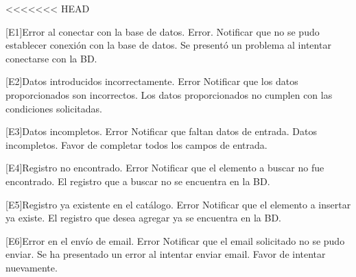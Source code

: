	\begin{Citemize}
<<<<<<< HEAD
		\item
		\begin{Message}{[E1]}{Error al conectar con la base de datos.}
			\MSGitem[Tipo: ] Error.
			\MSGitem[Objetivo: ] Notificar que no se pudo establecer conexión con la base de datos.
			\MSGitem[Redacción: ] Se presentó un problema al intentar conectarse con la BD.
		\end{Message}
	
		\item
		\begin{Message}{[E2]}{Datos introducidos incorrectamente.}
			\MSGitem[Tipo: ] Error
			\MSGitem[Objetivo: ] Notificar que los datos proporcionados son incorrectos.
			\MSGitem[Redacción: ] Los datos proporcionados no cumplen con las condiciones solicitadas.
		\end{Message}
	
		\item 
		\begin{Message}{[E3]}{Datos incompletos.}
			\MSGitem[Tipo: ] Error
			\MSGitem[Objetivo: ] Notificar que faltan datos de entrada.
			\MSGitem[Redacción: ] Datos incompletos. Favor de completar todos los campos de entrada.
		\end{Message}
	
		\item 
		\begin{Message}{[E4]}{Registro no encontrado.}
			\MSGitem[Tipo: ] Error
			\MSGitem[Objetivo: ] Notificar que el elemento a buscar no fue encontrado.
			\MSGitem[Redacción: ] El registro que a buscar no se encuentra en la BD.
		\end{Message}
	
		\item
		\begin{Message}{[E5]}{Registro ya existente en el catálogo.}
			\MSGitem[Tipo: ] Error
			\MSGitem[Objetivo: ] Notificar que el elemento a insertar ya existe.
			\MSGitem[Redacción: ] El registro que desea agregar ya se encuentra en la BD.
		\end{Message}
	
		\item
		\begin{Message}{[E6]}{Error en el envío de email.}
			\MSGitem[Tipo: ] Error
			\MSGitem[Objetivo: ] Notificar que el email solicitado no se pudo enviar.
			\MSGitem[Redacción: ] Se ha presentado un error al intentar enviar email. Favor de intentar nuevamente.
		\end{Message}
		

\end{Citemize}
